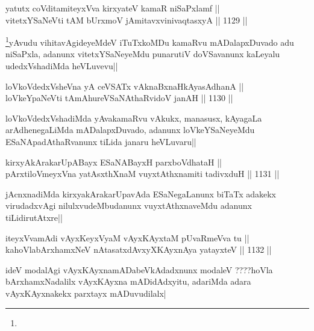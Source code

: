 \begin{shl}
yatutx coVditamiteyxVva kirxyateV kamaR niSaPxlamf || \\
vitetxYSaNeVti tAM bUrxmoV jAmitavxvinivaqtasxyA ||  1129 ||  
\end{shl}

\begin{artha}
\footnote{}yAvudu vihitavAgideyeMdeV iTuTxkoMDu kamaRvu mADalapxDuvado adu niSaPxla, adanunx vitetxYSaNeyeMdu punarutiV doVSavanunx kaLeyalu udedxVshadiMda heVLuvevu||
\end{artha}


\begin{shl}
loVkoVdedxVsheVna yA ceVSATx vAknaBxnaHkAyasAdhanA || \\
loVkeYpaNeVti tAmAhureVSaNAthaRvidoV janAH ||  1130 ||  
\end{shl}

\begin{artha}
loVkoVdedxVshadiMda yAvakamaRvu vAkukx, manasusx, kAyagaLa arAdhenegaLiMda mADalapxDuvado, adanunx loVkeYSaNeyeMdu ESaNApadAthaRvanunx tiLida janaru heVLuvaru||
\end{artha}


\begin{shl}
kirxyAkArakarUpABayx ESaNABayxH parxboVdhataH || \\
pArxtiloVmeyxVna yatAsxthXnaM vuyxtAthxnamiti tadivxduH ||  1131 ||  
\end{shl}

\begin{artha}
jAcnxnadiMda kirxyakArakarUpavAda ESaNegaLanunx biTaTx adakekx virudadxvAgi nilulxvudeMbudanunx vuyxtAthxnaveMdu adanunx tiLidirutAtxre||
\end{artha}

\begin{shl}
iteyxVvamAdi vAyxKeyxVyaM vAyxKAyxtaM pUvaRmeVva tu || \\
kahoVlabArxhamxNeV nAtasatxdAvxyXKAyxnAya yatayxteV ||  1132 ||  
\end{shl}

\begin{artha}
ideV modalAgi vAyxKAyxnamADabeVkAdadxnunx modaleV ????hoVla bArxhamxNadalilx vAyxKAyxna mADidAdxyitu, adariMda adara vAyxKAyxnakekx parxtayx mADuvudilalx|
\end{artha}


